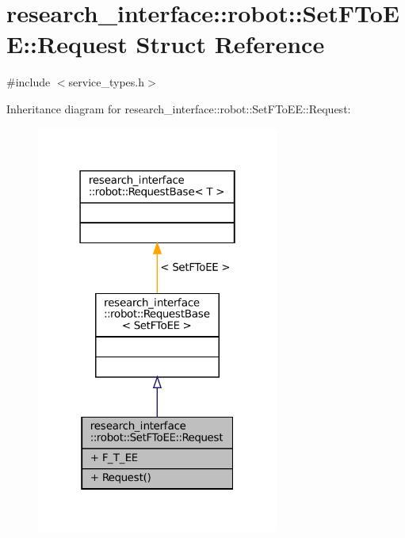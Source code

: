 \hypertarget{structresearch__interface_1_1robot_1_1SetFToEE_1_1Request}{}\section{research\+\_\+interface\+:\+:robot\+:\+:Set\+F\+To\+EE\+:\+:Request Struct Reference}
\label{structresearch__interface_1_1robot_1_1SetFToEE_1_1Request}


{\ttfamily \#include $<$service\+\_\+types.\+h$>$}



Inheritance diagram for research\+\_\+interface\+:\+:robot\+:\+:Set\+F\+To\+EE\+:\+:Request\+:
\nopagebreak
\begin{figure}[H]
\begin{center}
\leavevmode
\includegraphics[width=226pt]{structresearch__interface_1_1robot_1_1SetFToEE_1_1Request__inherit__graph}
\end{center}
\end{figure}


